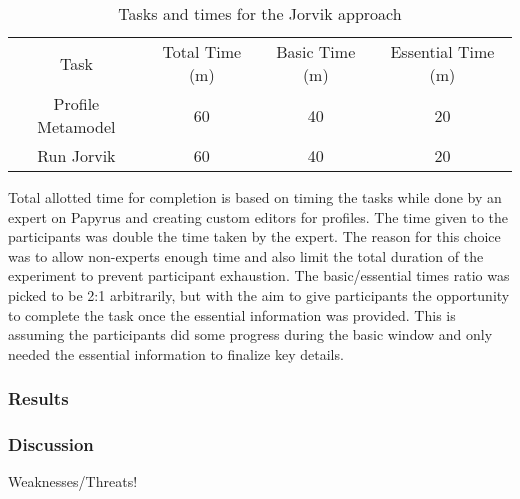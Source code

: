 \begin{table}
    \caption{Tasks and times for the Jorvik approach}
    \centering
    \setlength{\tabcolsep}{3.5pt} 
    \begin{tabular}{|c|c|c|c|}
        Task & Total Time (m) & Basic Time (m) & Essential Time (m) \\ 
        Profile Metamodel & 60 & 40 & 20 \\
        Run Jorvik & 60 & 40 & 20 \\
    \end{tabular}
\end{table}

Total allotted time for completion is based on timing the tasks while done by an expert on Papyrus and creating custom editors for profiles.
The time given to the participants was double the time taken by the expert.
The reason for this choice was to allow non-experts enough time and also limit the total duration of the experiment to prevent participant exhaustion.
The basic/essential times ratio was picked to be 2:1 arbitrarily, but with the aim to give participants the opportunity to complete the task once the essential information was provided.
This is assuming the participants did some progress during the basic window and only needed the essential information to finalize key details.

\subsubsection{Results}



\subsubsection{Discussion}
Weaknesses/Threats!

